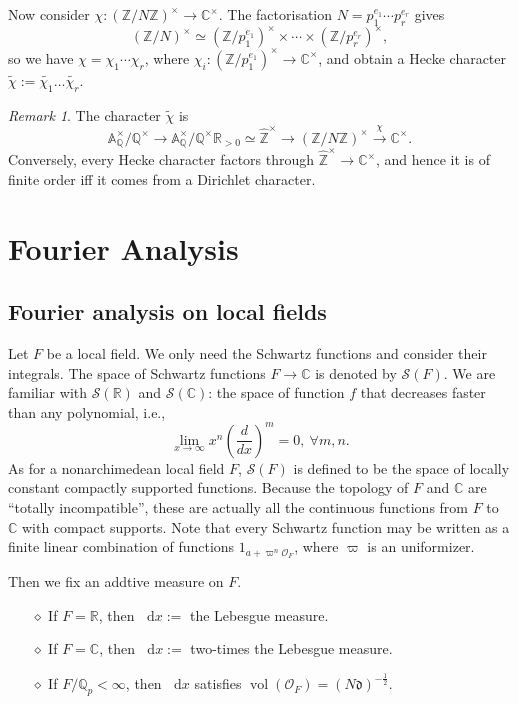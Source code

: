 \documentclass{article}
\theoremstyle{definition}
\theoremstyle{remark}
\newtheorem*{remark}{Remark}
\renewcommand{\tilde}{\widetilde}
\renewcommand{\hat}{\widehat}
\newcommand{\R}{\mathbb{R}}
\newcommand{\C}{\mathbb{C}}
\newcommand{\Q}{\mathbb{Q}}
\newcommand{\Z}{\mathbb{Z}}
\newcommand{\idele}[1]{\mathbb{A}_{#1}^{\times}}
\newcommand{\dx}{\mathop{}\!\mathrm{d}x}
\newcommand{\diff}{\mathfrak{d}}
\renewcommand{\O}{\mathcal{O}}
\DeclareMathOperator{\vol}{vol}
\newcommand{\myit}{$\diamond$}
\begin{document}
Now consider $\chi : (\Z/N\Z)^{\times}\to\C^\times$. The factorisation $N = p_1^{e_1}\cdots p_r^{e_r}$ gives \[(\Z/N)^\times \simeq (\Z/p_1^{e_1})^\times \times\cdots\times(\Z/p_{r}^{e_r})^\times,\]
so we have $\chi = \chi_1\cdots\chi_r$, where $\chi_i : (\Z/p_1^{e_1})^\times\to\C^\times$,
and obtain a Hecke character $\tilde{\chi} := \tilde{\chi_1}\dots\tilde{\chi_r}$.

\begin{remark}
    The character $\tilde{\chi}$ is \[\idele{\Q}/\Q^\times\to\idele{\Q}/\Q^\times\R_{>0}\simeq\hat{\Z}^\times\to (\Z/N\Z)^\times \stackrel{\chi}{\to}\C^\times.\]
    Conversely, every Hecke character factors through $\hat{\Z}^\times\to\C^\times$, and hence it is of finite order iff it comes from a Dirichlet character.
\end{remark}

\section{Fourier Analysis}

\subsection{Fourier analysis on local fields}
Let $F$ be a local field. 
We only need the Schwartz functions and consider their integrals. The space of Schwartz functions $F \to\C$ is denoted by $\mathcal{S}(F)$.
We are familiar with $\mathcal{S}(\R)$ and $\mathcal{S}(\C)$: the space of function $f$ that decreases faster than any polynomial, i.e., \[\lim_{x\to\infty}x^n \left( \frac{d}{dx} \right)^m = 0,\ \forall m, n.\]
As for a nonarchimedean local field $F$, $\mathcal{S}(F)$ is defined to be the space of locally constant compactly supported functions. Because the topology of $F$ and $\C$ are ``totally incompatible'', these are actually all the continuous functions from $F$ to $\C$ with compact supports.
Note that every Schwartz function may be written as a finite linear combination of functions $1_{a+\varpi^n\O_F}$, where $\varpi$ is an uniformizer.

Then we fix an addtive measure on $F$.
\begin{enumerate}
    \item [\myit] If $F = \R$, then $\dx := $ the Lebesgue measure.
    \item [\myit] If $F = \C$, then $\dx := $ two-times the Lebesgue measure.
    \item [\myit] If $F/\Q_p<\infty$, then $\dx$ satisfies $\vol(\O_{F}) = (N\diff)^{-\frac{1}{2}}$.
\end{enumerate}
\end{document}
